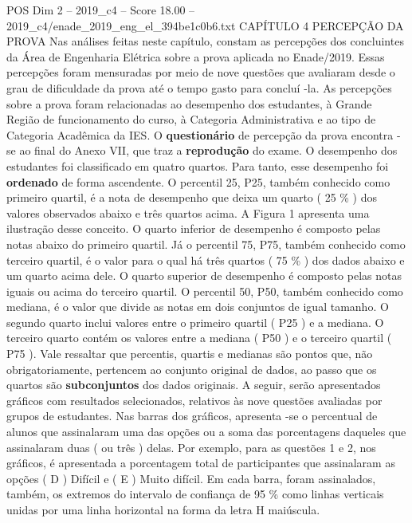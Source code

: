 \begin{textsample}{POS Dim 2 – 2019\_c4 – Score 18.00 – 2019\_c4/enade\_2019\_eng\_el\_394be1c0b6.txt}  \label{ex:f2_pos_045}
CAPÍTULO 4 PERCEPÇÃO DA PROVA Nas análises feitas neste capítulo, constam as percepções dos concluintes da Área de Engenharia Elétrica sobre a prova aplicada no Enade/2019.
Essas percepções foram mensuradas por meio de nove questões que avaliaram desde o grau de dificuldade da prova até o tempo gasto para concluí -la.
As percepções sobre a prova foram relacionadas ao desempenho dos estudantes, à Grande Região de funcionamento do curso, à Categoria Administrativa e ao tipo de Categoria Acadêmica da IES.
O \textbf{questionário} de percepção da prova encontra -se ao final do Anexo VII, que traz a \textbf{reprodução} do exame.
O desempenho dos estudantes foi classificado em quatro quartos.
Para tanto, esse desempenho foi \textbf{ordenado} de forma ascendente.
O percentil 25, P25, também conhecido como primeiro quartil, é a nota de desempenho que deixa um quarto ( 25 \% ) dos valores observados abaixo e três quartos acima.
A Figura 1 apresenta uma ilustração desse conceito.
O quarto inferior de desempenho é composto pelas notas abaixo do primeiro quartil.
Já o percentil 75, P75, também conhecido como terceiro quartil, é o valor para o qual há três quartos ( 75 \% ) dos dados abaixo e um quarto acima dele.
O quarto superior de desempenho é composto pelas notas iguais ou acima do terceiro quartil.
O percentil 50, P50, também conhecido como mediana, é o valor que divide as notas em dois conjuntos de igual tamanho.
O segundo quarto inclui valores entre o primeiro quartil ( P25 ) e a mediana.
O terceiro quarto contém os valores entre a mediana ( P50 ) e o terceiro quartil ( P75 ).
Vale ressaltar que percentis, quartis e medianas são pontos que, não obrigatoriamente, pertencem ao conjunto original de dados, ao passo que os quartos são \textbf{subconjuntos} dos dados originais.
A seguir, serão apresentados gráficos com resultados selecionados, relativos às nove questões avaliadas por grupos de estudantes.
Nas barras dos gráficos, apresenta -se o percentual de alunos que assinalaram uma das opções ou a soma das porcentagens daqueles que assinalaram duas ( ou três ) delas.
Por exemplo, para as questões 1 e 2, nos gráficos, é apresentada a porcentagem total de participantes que assinalaram as opções ( D ) Difícil e ( E ) Muito difícil.
Em cada barra, foram assinalados, também, os extremos do intervalo de confiança de 95 \% como linhas verticais unidas por uma linha horizontal na forma da letra H maiúscula.

\end{textsample}
